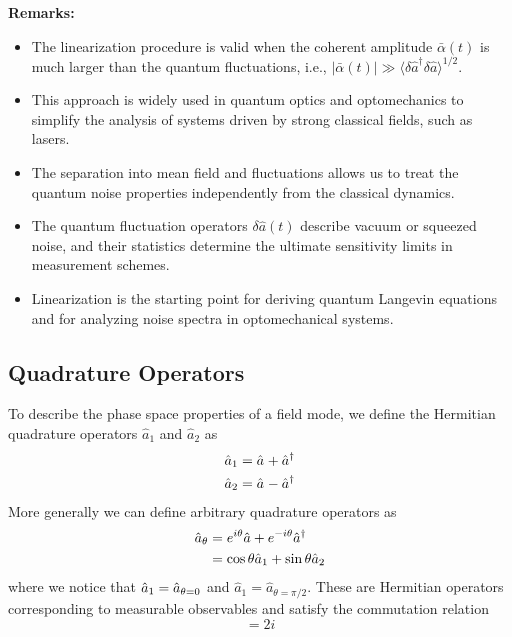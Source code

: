 \textbf{Remarks:} 
\begin{itemize}
  \item The linearization procedure is valid when the coherent amplitude $\bar{\alpha}(t)$ is much larger than the quantum fluctuations, i.e., $|\bar{\alpha}(t)| \gg \langle \delta\hat{a}^\dagger \delta\hat{a} \rangle^{1/2}$.
  \item This approach is widely used in quantum optics and optomechanics to simplify the analysis of systems driven by strong classical fields, such as lasers.
  \item The separation into mean field and fluctuations allows us to treat the quantum noise properties independently from the classical dynamics.
  \item The quantum fluctuation operators $\delta\hat{a}(t)$ describe vacuum or squeezed noise, and their statistics determine the ultimate sensitivity limits in measurement schemes.
  \item Linearization is the starting point for deriving quantum Langevin equations and for analyzing noise spectra in optomechanical systems.
\end{itemize}
\subsection*{Quadrature Operators}

To describe the phase space properties of a field mode, we define the Hermitian quadrature operators $\hat{a}_{1}$ and $\hat{a}_{2}$ as
\begin{equation}
  \begin{split}
    \hat{a}_{1} &= \hat{a}^{\vphantom{\dagger}} + \hat{a}^\dagger  \\
    \hat{a}_{2} &= \hat{a}^{\vphantom{\dagger}} - \hat{a}^\dagger
  \end{split}
\end{equation}
More generally we can define arbitrary quadrature operators as 
\begin{align}
  \hat{a}_{\theta} &= e^{i\theta}\hat{a}+ e^{-i\theta}\hat{a}^{\dagger} \notag \\ 
  & = \cos \theta \hat{a}_{1} + \sin \theta \hat{a}_{2}
\end{align}
where we notice that $\hat{a}_{1} = \hat{a}_{\theta=0\vphantom{\pi/2}}$ and $\hat{a}_{1} = \hat{a}_{\theta=\pi/2}$. These are Hermitian operators corresponding to measurable observables and satisfy the commutation relation
\begin{equation}
[a_{\theta \vphantom{\pi/2}}, a_{\theta+\pi/2}] = 2i
\end{equation}

